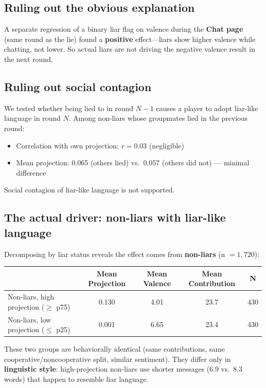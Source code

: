 \documentclass[11pt]{article}
\begin{document}
\subsection{Ruling out the obvious explanation}

A separate regression of a binary liar flag on valence during the \textbf{Chat page} (same round as the lie) found a \textbf{positive} effect---liars show higher valence while chatting, not lower. So actual liars are not driving the negative valence result in the next round.

\subsection{Ruling out social contagion}

We tested whether being lied to in round $N-1$ causes a player to adopt liar-like language in round $N$. Among non-liars whose groupmates lied in the previous round:
\begin{itemize}[nosep]
    \item Correlation with own projection: $r = 0.03$ (negligible)
    \item Mean projection: 0.065 (others lied) vs.\ 0.057 (others did not) --- minimal difference
\end{itemize}
Social contagion of liar-like language is not supported.

\subsection{The actual driver: non-liars with liar-like language}

Decomposing by liar status reveals the effect comes from \textbf{non-liars} (n $= 1{,}720$):

\begin{center}
\begin{tabular}{lcccc}
\toprule
& Mean Projection & Mean Valence & Mean Contribution & N \\
\midrule
Non-liars, high projection ($\geq$ p75) & 0.130 & 4.01 & 23.7 & 430 \\
Non-liars, low projection ($\leq$ p25) & 0.001 & 6.65 & 23.4 & 430 \\
\bottomrule
\end{tabular}
\end{center}

These two groups are behaviorally identical (same contributions, same cooperative/noncooperative split, similar sentiment). They differ only in \textbf{linguistic style}: high-projection non-liars use shorter messages (6.9 vs.\ 8.3 words) that happen to resemble liar language.
\end{document}
